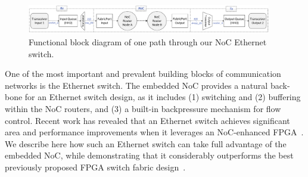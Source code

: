 %
%
%
%



\begin{figure}[t] \centering \vspace{0cm}
\includegraphics[width=0.95\textwidth, trim = 0cm 0.15cm 0cm 0.3cm]{images/complete-switch-path-new.pdf}
\caption{Functional block diagram of one path through our NoC Ethernet switch.}
\label{fig:switch-blk-diagram}
\vspace{0cm}
\end{figure}


%
%

One of the most important and prevalent building blocks of communication networks is the Ethernet switch.
The embedded NoC provides a natural back-bone for an Ethernet switch design, as it includes (1) switching and (2) buffering within the NoC routers, and (3) a built-in backpressure mechanism for flow control.
Recent work has revealed that an Ethernet switch achieves significant area and performance improvements when it leverages an NoC-enhanced FPGA~\cite{Bitar2014}.
We describe here how such an Ethernet switch can take full advantage of the embedded NoC, while demonstrating that it considerably outperforms the best previously proposed FPGA switch fabric design~\cite{dai-zhu}.

